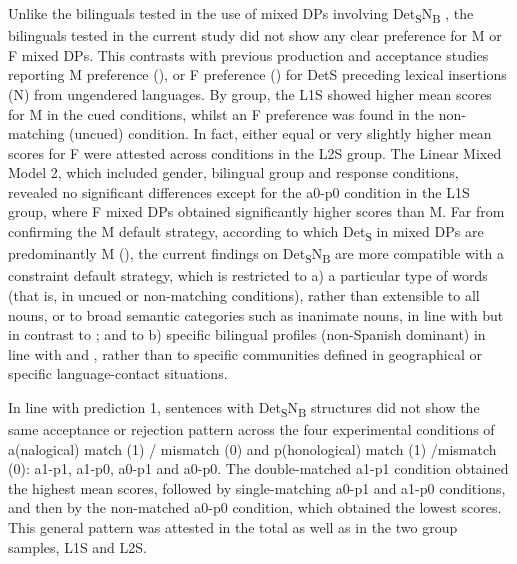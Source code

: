 \documentclass[output=paper]{langscibook}
\begin{document}
Unlike the bilinguals tested in the use of mixed DPs involving Det\textsubscript{S}N\textsubscript{B} \citep{Munarriz-IbarrolaEtAl2022}, the bilinguals tested in the current study did not show any clear preference for M or F mixed DPs. This contrasts with previous production and acceptance studies reporting M preference (\citealt{BadiolaSande2018,Cruz2023,ValdésKroff2016,ValdésKroffEtAl2017}), or F preference (\citealt{ParafitaCoutoEtAl2015basque}) for DetS preceding lexical insertions (N) from ungendered languages. By group, the L1S showed higher mean scores for M in the cued conditions, whilst an F preference was found in the non-matching (uncued) condition. In fact, either equal or very slightly higher mean scores for F were attested across conditions in the L2S group. The Linear Mixed Model 2, which included gender, bilingual group and response conditions, revealed no significant differences except for the a0-p0 condition in the L1S group, where F mixed DPs obtained significantly higher scores than M. Far from confirming the M default strategy, according to which Det\textsubscript{S} in mixed DPs are predominantly M (\citealt{Beatty-MartínezDussias2019,ValdésKroff2016}), the current findings on Det\textsubscript{S}N\textsubscript{B} are more compatible with a constraint default strategy, which is restricted to a) a particular type of words (that is, in uncued or non-matching conditions), rather than extensible to all nouns, or to broad semantic categories such as inanimate nouns, in line with \citet{Munarriz-IbarrolaEtAl2022} but in contrast to \citet{Cruz2023}; and to b) specific bilingual profiles (non-Spanish dominant) in line with \citet{LicerasEtAl2008} and  \citet{LicerasFernandezFuertes2018}, rather than to specific communities defined in geographical or specific language-contact situations.

In line with prediction 1, sentences with Det\textsubscript{S}N\textsubscript{B} structures did not show the same acceptance or rejection pattern across the four experimental conditions of a(nalogical) match (1) / mismatch (0) and p(honological) match (1) /mismatch (0): a1-p1, a1-p0, a0-p1 and a0-p0. The double-matched a1-p1 condition obtained the highest mean scores, followed by single-matching a0-p1 and a1-p0 conditions, and then by the non-matched a0-p0 condition, which obtained the lowest scores. This general pattern was attested in the total as well as in the two group samples, L1S and L2S.
\end{document}
